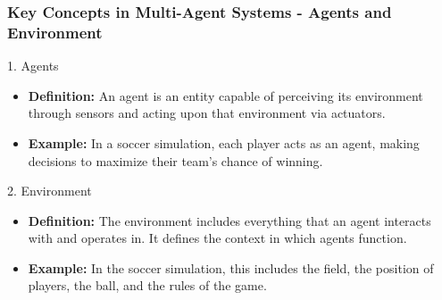 \documentclass[aspectratio=169]{beamer}
\begin{document}
\begin{frame}[fragile]
    \frametitle{Key Concepts in Multi-Agent Systems - Agents and Environment}
    \begin{block}{1. Agents}
        \begin{itemize}
            \item \textbf{Definition:} An agent is an entity capable of perceiving its environment through sensors and acting upon that environment via actuators.
            \item \textbf{Example:} In a soccer simulation, each player acts as an agent, making decisions to maximize their team's chance of winning.
        \end{itemize}
    \end{block}
    
    \begin{block}{2. Environment}
        \begin{itemize}
            \item \textbf{Definition:} The environment includes everything that an agent interacts with and operates in. It defines the context in which agents function.
            \item \textbf{Example:} In the soccer simulation, this includes the field, the position of players, the ball, and the rules of the game.
        \end{itemize}
    \end{block}
\end{frame}
\end{document}
